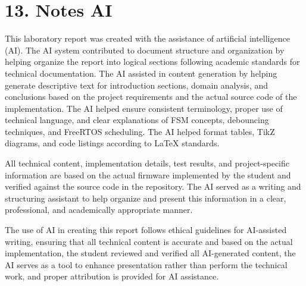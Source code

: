 \documentclass[12pt]{article}
\begin{document}
\section*{13. Notes AI}

This laboratory report was created with the assistance of artificial intelligence (AI). The AI system contributed to document structure and organization by helping organize the report into logical sections following academic standards for technical documentation. The AI assisted in content generation by helping generate descriptive text for introduction sections, domain analysis, and conclusions based on the project requirements and the actual source code of the implementation. The AI helped ensure consistent terminology, proper use of technical language, and clear explanations of FSM concepts, debouncing techniques, and FreeRTOS scheduling. The AI helped format tables, TikZ diagrams, and code listings according to LaTeX standards.

All technical content, implementation details, test results, and project-specific information are based on the actual firmware implemented by the student and verified against the source code in the repository. The AI served as a writing and structuring assistant to help organize and present this information in a clear, professional, and academically appropriate manner.

The use of AI in creating this report follows ethical guidelines for AI-assisted writing, ensuring that all technical content is accurate and based on the actual implementation, the student reviewed and verified all AI-generated content, the AI serves as a tool to enhance presentation rather than perform the technical work, and proper attribution is provided for AI assistance.
\end{document}
